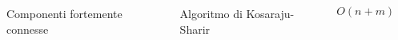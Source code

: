 \begin{minipage}[t]{\textwidth}
    \begin{columns}
        \begin{column}{0.25\textwidth}
        \centering
        Componenti fortemente connesse
        \end{column}
    \hfill
        \begin{column}{0.25\textwidth}
        \centering
        Algoritmo di Kosaraju-Sharir
        \end{column}
    \hfill
        \begin{column}{0.25\textwidth}
        \centering
        $O(n+m)$
        \end{column}
    \hfill
        \begin{column}{0.25\textwidth}
        \centering
        \resizebox{0.65\textwidth}{!}{}
        \end{column}
    \end{columns}
\end{minipage}